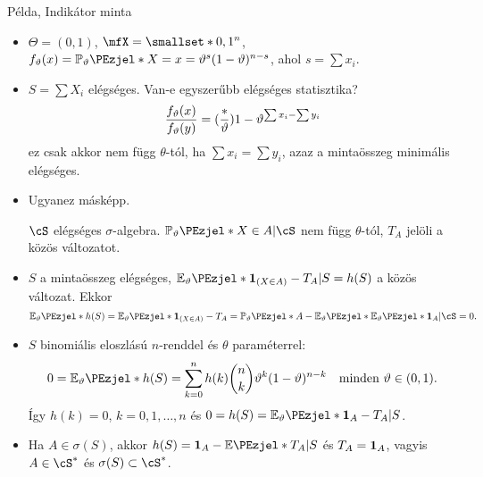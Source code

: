 \documentclass[aspectratio=169,notheorems,9pt,\option]{beamer}
\begin{document}
\begin{frame}{Példa, Indikátor minta}
  \begin{itemize}
    \item $\Theta=(0,1)$, $\mfX=\smallset*{0,1}^n$, 
      $f_\theta(x)=\P[\theta]{X=x}=\theta^{s}(1-\theta)^{n-s}$, ahol $s=\sum x_i$.
    \item $S=\sum X_i$ elégséges. Van-e egyszerűbb elégséges statisztika?
    \pause
    \begin{displaymath}
      \frac{f_\vartheta(x)}{f_\vartheta(y)}=(\frac{*}{\vartheta}){1-\vartheta}^{\sum x_i-\sum y_i}  
    \end{displaymath}
    ez csak akkor nem függ $\theta$-tól, ha $\sum x_i=\sum y_i$, azaz a mintaösszeg minimális elégséges.
    \item Ugyanez másképp. 
    
    $\cS$ elégséges $\sigma$-algebra. $\P[\theta]{X\in A|\cS}$ nem függ $\theta$-tól, 
    $T_A$ jelöli a közös változatot.
    \item $S$ a mintaösszeg elégséges, $\E[\theta]{\I{X\in A}-T_A|S}=h(S)$ a közös változat. Ekkor 
    \begin{displaymath}
      \E[\theta]{h(S)}=\E[\theta]{\I{X\in A}-T_A}
      =\P[\theta]{A}-\E[\theta]{\E[\theta]{\I[A]|\cS}}=0.
    \end{displaymath}
    \item $S$ binomiális eloszlású $n$-renddel 
    és $\theta$ paraméterrel:
    \begin{displaymath}
      0=\E[\theta]{h(S)}=
      \sum_{k=0}^n h(k)\binom n k \theta^k(1-\theta)^{n-k}\quad\text{minden $\theta\in(0,1)$}.
    \end{displaymath}
    Így $h(k)=0$, $k=0,1,\dots,n$ és $0=h(S)=\E[\theta]{\I[A]-T_A|S}$.
    \item Ha $A\in\sigma(S)$, akkor $h(S)=\I[A]-\E{T_A|S}$ és $T_A=\I[A]$, vagyis $A\in\cS^*$ és $\sigma(S)\subset\cS^*$.
  \end{itemize}
\end{frame}
\end{document}
